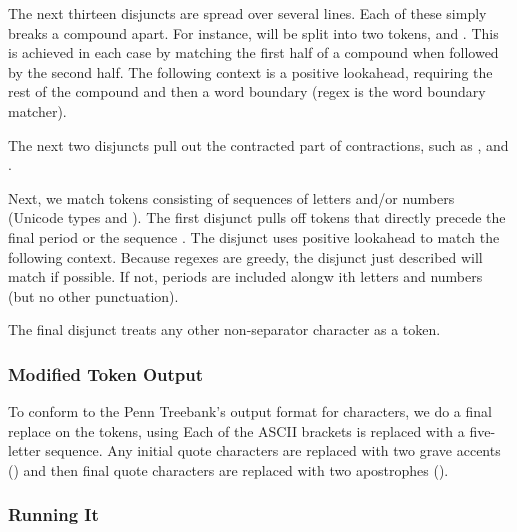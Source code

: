 The next thirteen disjuncts are spread over several lines.  Each of these
simply breaks a compound apart.  For instance, 
will be split into two tokens,  and
.  This is achieved in each case by matching the
first half of a compound when followed by the second half.  The
following context is a positive lookahead, requiring the rest of the
compound and then a word boundary (regex  is the word
boundary matcher).

The next two disjuncts pull out the contracted part of contractions,
such as ,  and .  

Next, we match tokens consisting of sequences of letters and/or
numbers (Unicode types  and ).  The first disjunct
pulls off tokens that directly precede the final period or the
sequence .  The disjunct uses positive lookahead to
match the following context.  Because regexes are greedy, the disjunct
just described will match if possible.  If not, periods are included
alongw ith letters and numbers (but no other punctuation).

The final disjunct treats any other non-separator character as
a token.

\subsubsection{Modified Token Output}

To conform to the Penn Treebank's output format for characters,
we do a final replace on the tokens, using
%
%
Each of the ASCII brackets is replaced with a five-letter sequence.
Any initial quote characters are replaced with two grave accents
() and then final quote characters are replaced
with two apostrophes ().

\subsubsection{Running It}

